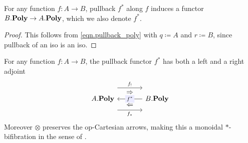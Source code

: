 \documentclass[Book-Poly]{subfiles}
\begin{document}
\begin{proposition}\label{prop.basechange}
For any function $f\colon A\to B$, pullback $f^*$ along $f$ induces a functor $\poly[B.]\to\poly[A.]$, which we also denote $f^*$.
\end{proposition}
\begin{proof}
This follows from \eqref{eqn.pullback_poly} with $q\coloneqq A$ and $r\coloneqq B$, since pullback of an iso is an iso.
\end{proof}

\begin{theorem}\label{thm.triple_adjoint_basechange}
For any function $f\colon A\to B$, the pullback functor $f^*$ has both a left and a right adjoint
\begin{equation}\label{eqn.adjoint_triple_monoidal_fib}
\begin{tikzcd}[column sep=large, background color=theoremcolor]
	\poly[A.]\ar[r, shift left=16pt, "f_!"]\ar[r, shift right=16pt, "f_*"']
	\ar[r, phantom, shift left=9pt, "\Rightarrow"]\ar[r, phantom, shift right=9pt, "\Leftarrow"]
&
	\poly[B.]\ar[l, "f^*" description]
\end{tikzcd}
\end{equation}
Moreover $\otimes$ preserves the op-Cartesian arrows, making this a monoidal $*$-bifibration in the sense of \cite[Definition 12.1]{shulman2008framed}.
\end{theorem}
\end{document}
